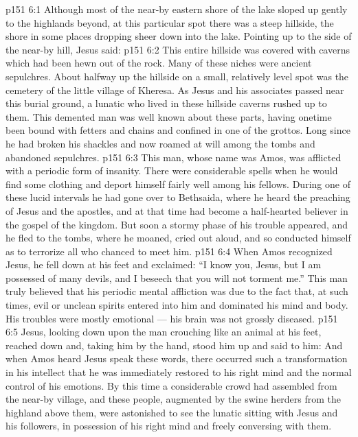 \vs p151 6:1 Although most of the near-by eastern shore of the lake sloped up gently to the highlands beyond, at this particular spot there was a steep hillside, the shore in some places dropping sheer down into the lake. Pointing up to the side of the near-by hill, Jesus said: 
\vs p151 6:2 This entire hillside was covered with caverns which had been hewn out of the rock. Many of these niches were ancient sepulchres. About halfway up the hillside on a small, relatively level spot was the cemetery of the little village of Kheresa. As Jesus and his associates passed near this burial ground, a lunatic who lived in these hillside caverns rushed up to them. This demented man was well known about these parts, having onetime been bound with fetters and chains and confined in one of the grottos. Long since he had broken his shackles and now roamed at will among the tombs and abandoned sepulchres.
\vs p151 6:3 This man, whose name was Amos, was afflicted with a periodic form of insanity. There were considerable spells when he would find some clothing and deport himself fairly well among his fellows. During one of these lucid intervals he had gone over to Bethsaida, where he heard the preaching of Jesus and the apostles, and at that time had become a half\hyp{}hearted believer in the gospel of the kingdom. But soon a stormy phase of his trouble appeared, and he fled to the tombs, where he moaned, cried out aloud, and so conducted himself as to terrorize all who chanced to meet him.
\vs p151 6:4 When Amos recognized Jesus, he fell down at his feet and exclaimed: “I know you, Jesus, but I am possessed of many devils, and I beseech that you will not torment me.” This man truly believed that his periodic mental affliction was due to the fact that, at such times, evil or unclean spirits entered into him and dominated his mind and body. His troubles were mostly emotional --- his brain was not grossly diseased.
\vs p151 6:5 Jesus, looking down upon the man crouching like an animal at his feet, reached down and, taking him by the hand, stood him up and said to him:  And when Amos heard Jesus speak these words, there occurred such a transformation in his intellect that he was immediately restored to his right mind and the normal control of his emotions. By this time a considerable crowd had assembled from the near-by village, and these people, augmented by the swine herders from the highland above them, were astonished to see the lunatic sitting with Jesus and his followers, in possession of his right mind and freely conversing with them.
